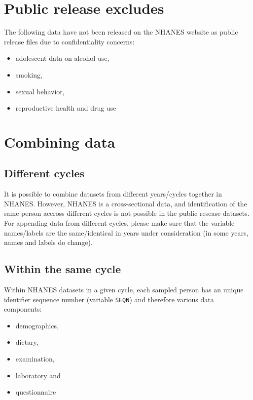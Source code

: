 \documentclass[
]{book}
\providecommand{\tightlist}{%
  \setlength{\itemsep}{0pt}\setlength{\parskip}{0pt}}
\begin{document}
\hypertarget{public-release-excludes}{%
\section{Public release excludes}\label{public-release-excludes}}

The following data have not been released on the NHANES website as public release files due to confidentiality concerns:

\begin{itemize}
\tightlist
\item
  adolescent data on alcohol use,
\item
  smoking,
\item
  sexual behavior,
\item
  reproductive health and drug use
\end{itemize}

\hypertarget{combining-data}{%
\section{Combining data}\label{combining-data}}

\hypertarget{different-cycles}{%
\subsection{Different cycles}\label{different-cycles}}

It is possible to combine datasets from different years/cycles together in NHANES. However, NHANES is a cross-sectional data, and identification of the same person accross different cycles is not possible in the public resease datasets. For appending data from different cycles, please make sure that the variable names/labels are the same/identical in years under consideration (in some years, names and labels do change).

\hypertarget{within-the-same-cycle}{%
\subsection{Within the same cycle}\label{within-the-same-cycle}}

Within NHANES datasets in a given cycle, each sampled person has an unique identifier sequence number (variable \texttt{SEQN}) and therefore various data components:

\begin{itemize}
\tightlist
\item
  demographics,
\item
  dietary,
\item
  examination,
\item
  laboratory and
\item
  questionnaire
\end{itemize}
\end{document}
